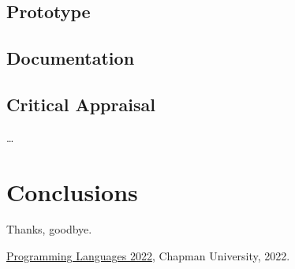 \documentclass{article}
\theoremstyle{theorem}
\theoremstyle{definition}
\theoremstyle{remark}
\begin{document}
\subsection{Prototype}
\subsection{Documentation}
\subsection{Critical Appraisal}

\ldots

\section{Conclusions}\label{conclusions}


Thanks, goodbye.

\begin{thebibliography}{99}
 \href{https://github.com/alexhkurz/programming-languages-2022/blob/main/README.md}{Programming Languages 2022}, Chapman University, 2022.
\end{thebibliography}

\end{document}
